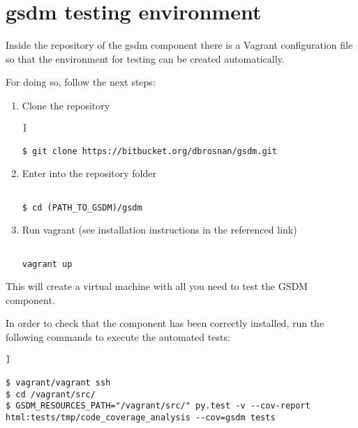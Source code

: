 \chapter{\acrshort{gsdm} testing environment}\label{c:install_gsdm}

Inside the repository of the \acrshort{gsdm} component there is a Vagrant configuration file so that the environment for testing can be created automatically.

For doing so, follow the next steps:

\begin{enumerate}

\item Clone the repository

\begin{lstlisting}[breaklines=true, style=c]]

$ git clone https://bitbucket.org/dbrosnan/gsdm.git

\end{lstlisting}

\item Enter into the repository folder

\begin{lstlisting}[breaklines=true, style=c]

$ cd (PATH_TO_GSDM)/gsdm

\end{lstlisting}

\item Run vagrant (see installation instructions in the referenced link)

\begin{lstlisting}[breaklines=true, style=c]

vagrant up

\end{lstlisting}

\end{enumerate}

This will create a virtual machine with all you need to test the GSDM component.

In order to check that the component has been correctly installed, run the following commands to execute the automated tests:

\begin{lstlisting}[breaklines=true, style=c]]

$ vagrant/vagrant ssh
$ cd /vagrant/src/
$ GSDM_RESOURCES_PATH="/vagrant/src/" py.test -v --cov-report html:tests/tmp/code_coverage_analysis --cov=gsdm tests

\end{lstlisting}

